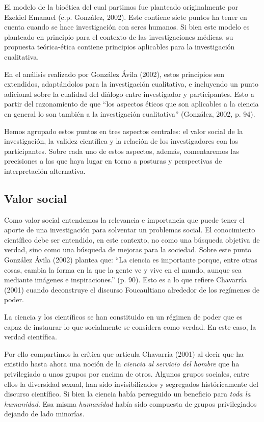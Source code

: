 El modelo de la bioética del cual partimos fue planteado originalmente por
Ezekiel Emanuel (c.p. González, 2002).
Este contiene siete puntos ha tener en cuenta cuando se hace investigación
con seres humanos.
Si bien este modelo es planteado en principio para el contexto de las
investigaciones médicas, su propuesta teórica-ética contiene principios
aplicables para la investigación cualitativa.

En el análisis realizado por González Ávila (2002),
estos principios son extendidos, adaptándolos para la investigación
cualitativa, e incluyendo un punto adicional sobre la cualidad del diálogo entre
investigador y participantes.
Esto a partir del razonamiento de que “los aspectos éticos que son aplicables
a la ciencia en general lo son también a la investigación cualitativa”
(González, 2002, p. 94).

Hemos agrupado estos puntos en tres aspectos centrales: el valor social de la
investigación, la validez científica y la relación de los investigadores con
los participantes.
Sobre cada uno de estos aspectos, además, comentaremos las precisiones a las
que haya lugar en torno a posturas y perspectivas de interpretación alternativa.

\subsection{Valor social}
Como valor social entendemos la relevancia e importancia que puede tener el
aporte de una investigación para solventar un problemas social.
El conocimiento científico debe ser entendido, en este contexto, no como
una búsqueda objetiva de verdad, sino como una búsqueda de mejoras para la
sociedad.
Sobre este punto González Ávila (2002) plantea que: “La ciencia es importante
porque, entre otras cosas, cambia la forma en la que la gente ve y vive en el
mundo, aunque sea mediante imágenes e inspiraciones.” (p. 90).
Esto es a lo que refiere Chavarría (2001) cuando deconstruye el discurso
Foucaultiano alrededor de los regímenes de poder.

La ciencia y los científicos se han constituido en un régimen de poder que es
capaz de instaurar lo que socialmente se considera como verdad.
En este caso, la verdad científica.

Por ello compartimos la crítica que articula Chavarría (2001) al decir que ha
existido hasta ahora una noción de la \emph{ciencia al servicio del hombre}
que ha privilegiado a unos grupos por encima de otros.
Algunos grupos sociales, entre ellos la diversidad sexual, han sido
invisibilizados y segregados históricamente del discurso científico.
Si bien la ciencia había perseguido un beneficio para \emph{toda la humanidad}.
Esa misma \emph{humanidad} había sido compuesta de grupos privilegiados
dejando de lado minorías.


